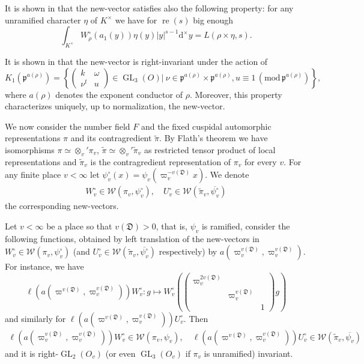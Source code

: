 \documentclass[a4paper,11pt]{amsart}
\theoremstyle{definition}
\newcommand{\gelle}{\operatorname{GL}}
\newcommand{\real}{\operatorname{re}}
\newcommand{\mods}[1]{\,(\mathrm{mod}\,{#1})}
\begin{document}
It is shown in \cite{matringe2012essential} that the new-vector satisfies also the following property: for any unramified character $\eta$ of $K^\times$ we have for $\real(s)$ big enough
\begin{equation*}
    \int_{K^\times}W_\rho^\circ(a_1(y))\eta(y)\vert y\vert^{s-1} \mathrm{d}^\times y = L(\rho \times \eta,s).
\end{equation*}

It is shown in \cite{conducteurgln} that the new-vector is right-invariant under the action of 
\[K_1(\mathfrak{p}^{a(\rho)}) = \left\{\begin{pmatrix}
    k&\omega\\\nu^t&u
\end{pmatrix}\in \gelle_3(O) |  \ \nu \in \mathfrak{p}^{a(\rho)}\times \mathfrak{p}^{a(\rho)}, u\equiv 1\mods{\mathfrak p^{a(\rho)}} \right\}, \]
where $a(\rho)$ denotes the exponent conductor of $\rho$. Moreover, this property characterizes uniquely, up to normalization, the new-vector. 


We now consider the number field $F$ and the fixed cuspidal automorphic representations $\pi$ and its contragredient $\tilde{\pi}$. By Flath's theorem we have isomorphisms $\pi \simeq \otimes_v'\pi_v$, $\tilde{\pi} \simeq \otimes_v' \tilde{\pi}_v$ as restricted tensor product of local representations and $\tilde{\pi}_v$ is the contragredient representation of $\pi_v$ for every $v$. For any finite place $v<\infty$ let $\psi_v^\circ(x) = \psi_v(\varpi_v^{-v(\mathfrak{D})}x)$. We denote \begin{align*}W_v^\circ \in \mathcal{W}(\pi_v,\psi_v^\circ), \quad U_v^\circ \in \mathcal{W}(\tilde{\pi}_v,\overline{\psi_v^\circ})\end{align*}
the corresponding new-vectors.

Let $v<\infty$ be a place so that $v(\mathfrak{D})>0$, that is, $\psi_v$ is ramified, consider the following functions, obtained by left translation of the new-vectors in $W^\circ_{v}\in \mathcal{W}(\pi_v,\psi_v^\circ)$ (and $U_v^\circ \in \mathcal{W}(\tilde{\pi}_v,\overline{\psi_v^\circ})$ respectively) by $a(\varpi_v^{v(\mathfrak{D})},\varpi_v^{v(\mathfrak{D})})$. For instance, we have
    \[\ell\left(a(\varpi^{v(\mathfrak{D})},\varpi_v^{v(\mathfrak{D})})\right)W_{v}^{\circ} \colon g\mapsto  W_{v}^{\circ}\left(\begin{pmatrix}
    \varpi_v^{2v(\mathfrak{D})}&&\\&\varpi_v^{v(\mathfrak{D})}\\&&1
    \end{pmatrix}g \right)\]
    and similarly for $\ell\left(a(\varpi^{v(\mathfrak{D})},\varpi_v^{v(\mathfrak{D})})\right)U_{v}^{\circ}$.
    Then \begin{align*}\ell\left(a(\varpi_v^{v(\mathfrak{D})},\varpi_v^{v(\mathfrak{D})})\right)W_{v}^{\circ} \in \mathcal{W}(\pi_v,\psi_v), \quad \ell\left(a(\varpi^{v(\mathfrak{D})},\varpi_v^{v(\mathfrak{D})})\right)U_{v}^{\circ} \in \mathcal{W}(\tilde{\pi}_v,\overline{\psi_v})
    \end{align*} 
    and it is right-$\gelle_2(O_v)$ (or even $\gelle_3(O_v)$ if $\pi_v$ is unramified) invariant. 
\end{document}
